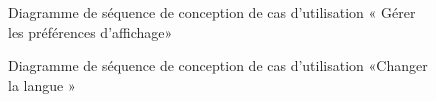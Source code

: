 \begin{figure}[H]
  \centering
  \caption{Diagramme de séquence de conception de cas d'utilisation « Gérer les préférences d'affichage»}
  \label{fig:conception_sequence_preferance_affichage}
\end{figure}

\begin{figure}[H]
  \centering
  \caption{Diagramme de séquence de conception de cas d'utilisation «Changer la langue »}
  \label{fig:conception_sequence_change_language}
\end{figure}

